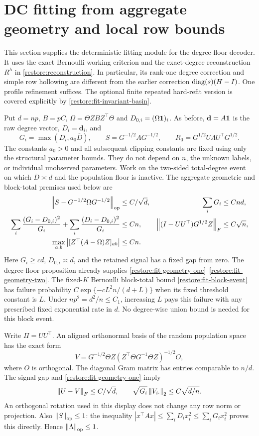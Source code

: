 \section{DC fitting from aggregate geometry and local row bounds}
\label{restore:fit}

This section supplies the deterministic fitting module for the
degree-floor decoder. It uses the exact Bernoulli working criterion and
the exact-degree reconstruction $R^h$ in \eqref{restore:reconstruction}.
In particular, its rank-one degree correction and simple row hollowing
are different from the earlier correction $\operatorname{diag}(s)(H-I)$.
One profile refinement suffices. The optional finite repeated hard-refit
version is covered explicitly by \cref{restore:fit-invariant-basin}.

Put $d=np$, $B=pC$, $\Omega=\Theta ZBZ^\top\Theta$ and
$D_{0,i}=(\Omega\mathbf 1)_i$. As before, $\mathbf d=A\mathbf 1$ is the raw
degree vector, $D_i=\mathbf d_i$, and
\[
 G_i=\max(D_i,a_0\overline D),\qquad
 S=G^{-1/2}AG^{-1/2},\qquad
 R_0=G^{1/2}U\Lambda U^\top G^{1/2}.
\]
The constants $a_0>0$ and all subsequent clipping constants are fixed
using only the structural parameter bounds. They do not depend on $n$,
the unknown labels, or individual unobserved parameters.
Work on the two-sided total-degree event on which
$\overline D\asymp d$ and the population floor is inactive.
The aggregate geometric and block-total premises used below are
\begin{align}
 \left\lVert S-G^{-1/2}\Omega G^{-1/2}\right\rVert_{\mathrm{op}}
   &\le C/\sqrt d,&
 \sum_iG_i&\le Cnd, \label{restore:fit-geometry-one}\\
 \sum_i\frac{(G_i-D_{0,i})^2}{G_i}
 +\sum_i\frac{(D_i-D_{0,i})^2}{G_i}
   &\le Cn,&
 \left\lVert(I-UU^\top)G^{1/2}Z\right\rVert_F&\le C\sqrt n,
 \label{restore:fit-geometry-two}\\
 \max_{a,b}\left|[Z^\top(A-\Omega)Z]_{ab}\right|
   &\le Cn.&& \label{restore:fit-block-event}
\end{align}
Here $G_i\ge cd$, $D_{0,i}\asymp d$, and the retained signal has a fixed
gap from zero. The degree-floor proposition already supplies
\eqref{restore:fit-geometry-one}--\eqref{restore:fit-geometry-two}.
The fixed-$K$ Bernoulli block-total bound
\eqref{restore:fit-block-event} has failure probability
$C\exp\{-cL^2n/(d+L)\}$ when its fixed threshold constant is $L$.
Under $np^2=d^2/n\le C_1$, increasing $L$ pays this failure with any
prescribed fixed exponential rate in $d$. No degree-wise union bound
is needed for this block event.

Write $\Pi=UU^\top$. An aligned orthonormal basis of the random
population space has the exact form
\[
 V=G^{-1/2}\Theta Z
       (Z^\top\Theta G^{-1}\Theta Z)^{-1/2}O,
\]
where $O$ is orthogonal. The diagonal Gram matrix has entries comparable
to $n/d$. The signal gap and \eqref{restore:fit-geometry-one} imply
\begin{equation}\label{restore:fit-basis}
 \left\lVert U-V\right\rVert_F\le C/\sqrt d,\qquad
 \sqrt{G_i}\left\lVert V_{i\cdot}\right\rVert_2\le C\sqrt{d/n}.
\end{equation}
An orthogonal rotation used in this display does not change any row
norm or projection. Also $\left\lVert S\right\rVert_{\mathrm{op}}\le1$: the inequality
$|x^\top Ax|\le\sum_iD_ix_i^2\le\sum_iG_ix_i^2$ proves this directly.
Hence $\left\lVert\Lambda\right\rVert_{\mathrm{op}}\le1$.

